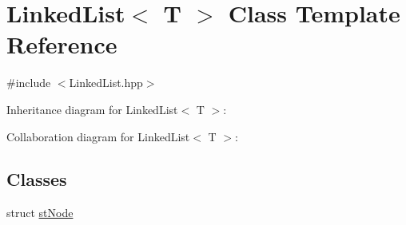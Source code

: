 \hypertarget{class_linked_list}{}\section{Linked\+List$<$ T $>$ Class Template Reference}
\label{class_linked_list}


{\ttfamily \#include $<$Linked\+List.\+hpp$>$}



Inheritance diagram for Linked\+List$<$ T $>$\+:


Collaboration diagram for Linked\+List$<$ T $>$\+:
\subsection*{Classes}
\begin{DoxyCompactItemize}
\item 
struct \hyperlink{struct_linked_list_1_1st_node}{st\+Node}
\end{DoxyCompactItemize}
